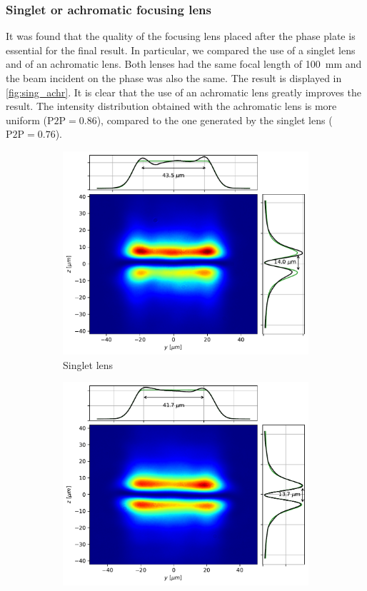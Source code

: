 \subsubsection{Singlet or achromatic focusing lens}
It was found that the quality of the focusing lens placed after the phase plate is essential for the final result. In particular, we compared the use of a singlet lens and of an achromatic lens. Both lenses had the same focal length of \SI{100}{mm} and the beam incident on the phase was also the same. The result is displayed in \cref{fig:sing_achr}. It is clear that the use of an achromatic lens greatly improves the result. The intensity distribution obtained with the achromatic lens is more uniform ($\text{P2P} = 0.86$), compared to the one generated by the singlet lens ($\text{P2P} =0.76$).
\begin{figure}
    \centering
    \begin{subfigure}{0.45\textwidth}
        \includegraphics[width=\textwidth]{chapters/chapter_3/figures/sing.pdf}
        \caption{Singlet lens}
        \label{fig:singlet}
    \end{subfigure}
    \hfill
    \begin{subfigure}{0.45\textwidth}
        \includegraphics[width=\textwidth]{chapters/chapter_3/figures/achr.pdf}

\end{subfigure}
\end{figure}
